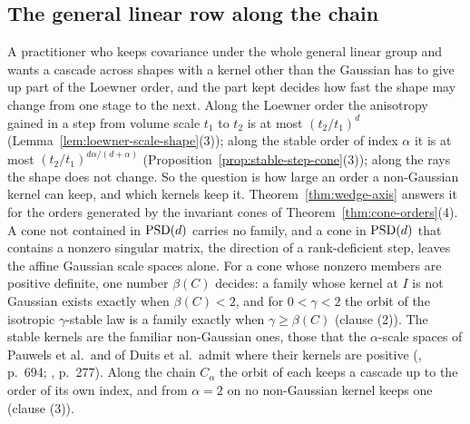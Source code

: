 
\subsection{The general linear row along the chain}\label{sec:wedge-axis-proof}

A practitioner who keeps covariance under the whole general linear group and wants a cascade across
shapes with a kernel other than the Gaussian has to give up part of the Loewner order, and the part kept decides how fast the shape may change from one
stage to the next. Along the Loewner order the anisotropy gained in a step from volume scale $t_1$
to $t_2$ is at most $(t_2/t_1)^d$ (Lemma~\ref{lem:loewner-scale-shape}(3)); along the stable order
of index $\alpha$ it is at most $(t_2/t_1)^{d\alpha/(d+\alpha)}$
(Proposition~\ref{prop:stable-step-cone}(3)); along the rays the shape does not change. So the
question is how large an order a non-Gaussian kernel can keep, and which kernels keep it.
Theorem~\ref{thm:wedge-axis} answers it for the orders generated by the invariant cones of
Theorem~\ref{thm:cone-orders}(4). A cone not contained in $\mathrm{PSD}(d)$ carries no family, and a cone in
$\mathrm{PSD}(d)$ that contains a nonzero singular matrix, the direction of a rank-deficient step, leaves
the affine Gaussian scale spaces alone. For a cone whose nonzero members are positive definite, one
number $\beta(C)$ decides: a family whose kernel at $I$ is not Gaussian exists exactly when
$\beta(C) < 2$, and for $0 < \gamma < 2$ the orbit of the isotropic $\gamma$-stable law is a family
exactly when $\gamma \ge \beta(C)$ (clause (2)). The stable kernels are the familiar non-Gaussian
ones, those that the $\alpha$-scale spaces of Pauwels et al.\ and of Duits et al.\ admit where their
kernels are positive
(, p.~694; , p.~277). Along the chain $C_\alpha$
the orbit of each keeps a cascade up to the order of its own index, and from $\alpha = 2$ on no
non-Gaussian kernel keeps one (clause (3)).

